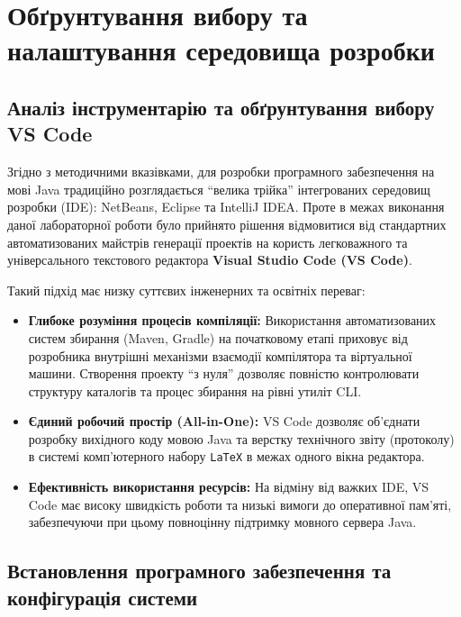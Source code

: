 \section{Обґрунтування вибору та налаштування середовища розробки}

\subsection{Аналіз інструментарію та обґрунтування вибору VS Code}

Згідно з методичними вказівками, для розробки програмного забезпечення на мові Java 
традиційно розглядається ``велика трійка'' інтегрованих середовищ розробки (IDE): NetBeans, 
Eclipse та IntelliJ IDEA. Проте в межах виконання даної лабораторної роботи було прийнято 
рішення відмовитися від стандартних автоматизованих майстрів генерації проектів на користь 
легковажного та універсального текстового редактора \textbf{Visual Studio Code (VS Code)}.

Такий підхід має низку суттєвих інженерних та освітніх переваг:
\begin{itemize}
    \item \textbf{Глибоке розуміння процесів компіляції:} 
    Використання автоматизованих систем збирання (Maven, Gradle) на початковому етапі приховує 
    від розробника внутрішні механізми взаємодії компілятора та віртуальної машини. Створення 
    проекту ``з нуля'' дозволяє повністю контролювати структуру каталогів та процес збирання 
    на рівні утиліт CLI.
    \item \textbf{Єдиний робочий простір (All-in-One):} 
    VS Code дозволяє об'єднати розробку вихідного коду мовою Java та верстку технічного 
    звіту (протоколу) в системі комп'ютерного набору \texttt{LaTeX} в межах одного вікна редактора.
    \item \textbf{Ефективність використання ресурсів:} На відміну від важких IDE, VS Code 
    має високу швидкість роботи та низькі вимоги до оперативної пам'яті, забезпечуючи при 
    цьому повноцінну підтримку мовного сервера Java.
\end{itemize}

\subsection{Встановлення програмного забезпечення та конфігурація системи}

